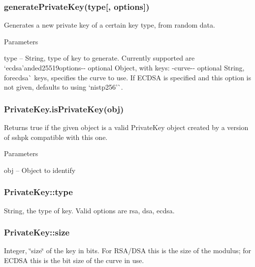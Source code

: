 \subsubsection*{{\ttfamily generate\+Private\+Key(type\mbox{[}, options\mbox{]})}}

Generates a new private key of a certain key type, from random data.

Parameters


\begin{DoxyItemize}
\item {\ttfamily type} -- String, type of key to generate. Currently supported are `\textquotesingle{}ecdsa'{\ttfamily  and}\textquotesingle{}ed25519\textquotesingle{}{\ttfamily  -\/}options{\ttfamily -\/-\/ optional Object, with keys\+: -\/}curve{\ttfamily -\/-\/ optional String, for}\textquotesingle{}ecdsa\textquotesingle{}\`{} keys, specifies the curve to use. If E\+C\+D\+SA is specified and this option is not given, defaults to using `\textquotesingle{}nistp256'\`{}.
\end{DoxyItemize}

\subsubsection*{{\ttfamily Private\+Key.\+is\+Private\+Key(obj)}}

Returns {\ttfamily true} if the given object is a valid {\ttfamily Private\+Key} object created by a version of {\ttfamily sshpk} compatible with this one.

Parameters


\begin{DoxyItemize}
\item {\ttfamily obj} -- Object to identify
\end{DoxyItemize}

\subsubsection*{{\ttfamily Private\+Key\+::type}}

String, the type of key. Valid options are {\ttfamily rsa}, {\ttfamily dsa}, {\ttfamily ecdsa}.

\subsubsection*{{\ttfamily Private\+Key\+::size}}

Integer, \char`\"{}size\char`\"{} of the key in bits. For R\+S\+A/\+D\+SA this is the size of the modulus; for E\+C\+D\+SA this is the bit size of the curve in use.

